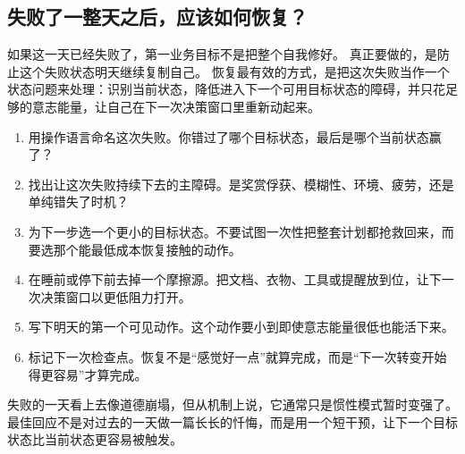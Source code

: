 \subsection{失败了一整天之后，应该如何恢复？}

如果这一天已经失败了，第一业务目标不是把整个自我修好。
真正要做的，是防止这个失败状态明天继续复制自己。
恢复最有效的方式，是把这次失败当作一个状态问题来处理：识别当前状态，降低进入下一个可用目标状态的障碍，并只花足够的意志能量，让自己在下一次决策窗口里重新动起来。

\begin{enumerate}[nosep]
  \item 用操作语言命名这次失败。你错过了哪个目标状态，最后是哪个当前状态赢了？
  \item 找出让这次失败持续下去的主障碍。是奖赏俘获、模糊性、环境、疲劳，还是单纯错失了时机？
  \item 为下一步选一个更小的目标状态。不要试图一次性把整套计划都抢救回来，而要选那个能最低成本恢复接触的动作。
  \item 在睡前或停下前去掉一个摩擦源。把文档、衣物、工具或提醒放到位，让下一次决策窗口以更低阻力打开。
  \item 写下明天的第一个可见动作。这个动作要小到即使意志能量很低也能活下来。
  \item 标记下一次检查点。恢复不是“感觉好一点”就算完成，而是“下一次转变开始得更容易”才算完成。
\end{enumerate}

\begin{remark}
失败的一天看上去像道德崩塌，但从机制上说，它通常只是惯性模式暂时变强了。
最佳回应不是对过去的一天做一篇长长的忏悔，而是用一个短干预，让下一个目标状态比当前状态更容易被触发。
\end{remark}